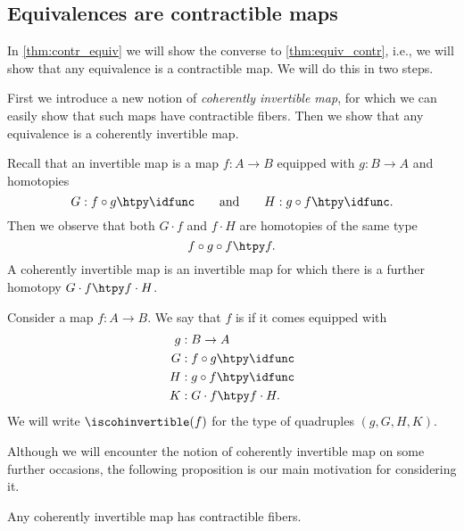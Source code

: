 \subsection{Equivalences are contractible maps}\label{sec:is-contr-map-is-equiv}

In \cref{thm:contr_equiv} we will show the converse to \cref{thm:equiv_contr}, i.e., we will show that any equivalence is a contractible map. We will do this in two steps.

First we introduce a new notion of \emph{coherently invertible map}, for which we can easily show that such maps have contractible fibers. Then we show that any equivalence is a coherently invertible map.

  Recall that an invertible map is a map $f:A\to B$ equipped with $g:B\to A$ and homotopies
  \begin{equation*}
    G : f\circ g \htpy \idfunc\qquad\text{and}\qquad H:g\circ f\htpy \idfunc.
  \end{equation*}
  Then we observe that both $G \cdot f$ and $f \cdot H$ are homotopies of the same type
  \begin{equation*}
    f\circ g\circ f \htpy f.
  \end{equation*}
  A coherently invertible map is an invertible map for which there is a further homotopy $G \cdot f\htpy f\cdot H$.

  \begin{defn}
    Consider a map $f:A\to B$. We say that $f$ is  if it comes equipped with
    \begin{align*}
      g & : B \to A \\
      G & : f \circ g \htpy \idfunc \\
      H & : g \circ f \htpy \idfunc \\
      K & : G \cdot f \htpy f \cdot H.
    \end{align*}
    We will write $\iscohinvertible(f)$ for the type of quadruples $(g,G,H,K)$.
  \end{defn}

  Although we will encounter the notion of coherently invertible map on some further occasions, the following proposition is our main motivation for considering it.

  \begin{prp}\label{lem:contr-inv}
    Any coherently invertible map has contractible fibers.
  \end{prp}

